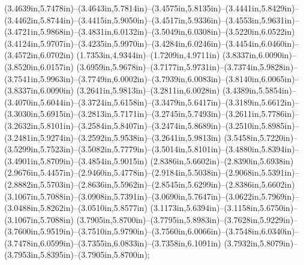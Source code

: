 (3.4639in,5.7478in)--(3.4643in,5.7814in)--(3.4575in,5.8135in)--(3.4441in,5.8429in)--(3.4462in,5.8744in)--(3.4415in,5.9050in)--(3.4517in,5.9336in)--(3.4553in,5.9631in)--(3.4721in,5.9868in)--(3.4831in,6.0132in)--(3.5049in,6.0308in)--(3.5220in,6.0522in) (3.4124in,5.9707in)--(3.4235in,5.9970in)--(3.4284in,6.0246in)--(3.4454in,6.0460in)--(3.4572in,6.0702in) (1.7353in,4.9344in)--(1.7209in,4.9711in) (3.8337in,6.0090in)--(3.8520in,6.0157in) (3.6959in,5.9678in)--(3.7177in,5.9731in)--(3.7374in,5.9828in)--(3.7541in,5.9963in)--(3.7749in,6.0002in)--(3.7939in,6.0083in)--(3.8140in,6.0065in)--(3.8337in,6.0090in) (3.2641in,5.9813in)--(3.2811in,6.0028in) (3.4389in,5.5854in)--(3.4070in,5.6044in)--(3.3724in,5.6158in)--(3.3479in,5.6417in)--(3.3189in,5.6612in)--(3.3030in,5.6915in)--(3.2813in,5.7171in)--(3.2745in,5.7493in)--(3.2611in,5.7786in)--(3.2632in,5.8101in)--(3.2584in,5.8407in)--(3.2474in,5.8689in)--(3.2510in,5.8985in)--(3.2481in,5.9274in)--(3.2592in,5.9538in)--(3.2641in,5.9813in) (3.5458in,5.7220in)--(3.5299in,5.7523in)--(3.5082in,5.7779in)--(3.5014in,5.8101in)--(3.4880in,5.8394in)--(3.4901in,5.8709in)--(3.4854in,5.9015in) (2.8386in,5.6602in)--(2.8390in,5.6938in) (2.9676in,5.4457in)--(2.9460in,5.4778in)--(2.9184in,5.5038in)--(2.9068in,5.5391in)--(2.8882in,5.5703in)--(2.8636in,5.5962in)--(2.8545in,5.6299in)--(2.8386in,5.6602in) (3.1067in,5.7088in)--(3.0908in,5.7391in)--(3.0690in,5.7647in)--(3.0622in,5.7969in)--(3.0488in,5.8262in)--(3.0510in,5.8577in) (3.1173in,5.6394in)--(3.1158in,5.6750in)--(3.1067in,5.7088in) (3.7905in,5.8700in)--(3.7795in,5.8983in)--(3.7628in,5.9229in)--(3.7600in,5.9519in)--(3.7510in,5.9790in)--(3.7560in,6.0066in)--(3.7548in,6.0340in)--(3.7478in,6.0599in)--(3.7355in,6.0833in)--(3.7358in,6.1091in) (3.7932in,5.8079in)--(3.7953in,5.8395in)--(3.7905in,5.8700in);
